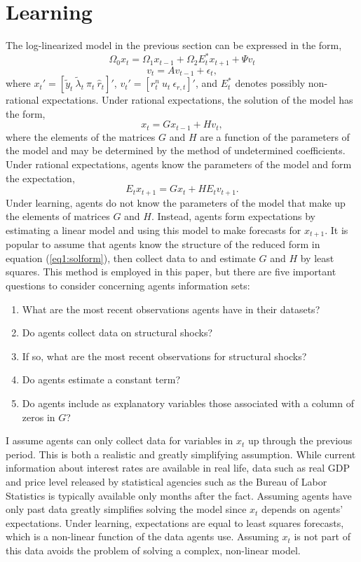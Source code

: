 \documentclass[11pt]{article}
\newcommand{\be}{\begin{enumerate}}
\newcommand{\ee}{\end{enumerate}}
\newcommand{\beq}{\begin{equation}}
\newcommand{\eeq}{\end{equation}}
\newcommand{\bdm}{\begin{displaymath}}
\newcommand{\edm}{\end{displaymath}}
\newcommand{\h}[1]{\hat{#1}}
\begin{document}
\section{Learning}
The log-linearized model in the previous section can be expressed in the form,
\beq \label{eq1:sform} \Omega_{0} x_t = \Omega_{1} x_{t-1} + \Omega_{2} E_t^* x_{t+1} + \Psi v_t \eeq
\beq \label{eq1:sformv} v_t = A v_{t-1} + \epsilon_t, \eeq
where $x_t' = [\tilde{y}_t~ \tilde{\lambda}_t~ \pi_t~ \h{r}_t]'$, $v_t' = [r_t^n~ u_t~ \epsilon_{r,t}]'$, and $E_t^*$ denotes possibly non-rational expectations.  Under rational expectations, the solution of the model has the form,
\beq \label{eq1:solform} x_t = G x_{t-1} + H v_t, \eeq
where the elements of the matrices $G$ and $H$ are a function of the parameters of the model and may be determined by the method of undetermined coefficients.  Under rational expectations, agents know the parameters of the model and form the expectation,
\bdm E_t x_{t+1} = G x_t + H E_t v_{t+1}. \edm
Under learning, agents do not know the parameters of the model that make up the elements of matrices $G$ and $H$.  Instead, agents form expectations by estimating a linear model and using this model to make forecasts for $x_{t+1}$.  It is popular to assume that agents know the structure of the reduced form in equation (\ref{eq1:solform}), then collect data to and estimate $G$ and $H$ by least squares.  This method is employed in this paper, but there are five important questions to consider concerning agents information sets:
\be
\item What are the most recent observations agents have in their datasets?
\item Do agents collect data on structural shocks? 
\item If so, what are the most recent observations for structural shocks?
\item Do agents estimate a constant term?
\item Do agents include as explanatory variables those associated with a column of zeros in $G$?
\ee

I assume agents can only collect data for variables in $x_t$ up through the previous period.  This is both a realistic and greatly simplifying assumption.  While current information about interest rates are available in real life, data such as real GDP and price level released by statistical agencies such as the Bureau of Labor Statistics is typically available only months after the fact.  Assuming agents have only past data greatly simplifies solving the model since $x_t$ depends on agents' expectations.  Under learning, expectations are equal to least squares forecasts, which is a non-linear function of the data agents use.  Assuming $x_t$ is not part of this data avoids the problem of solving a complex, non-linear model.
\end{document}
